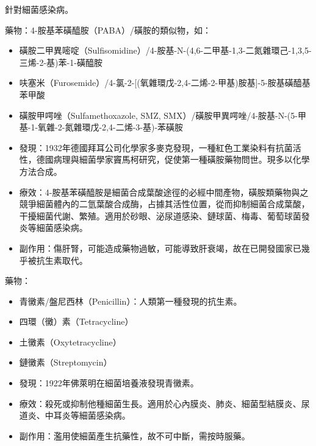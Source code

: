 \documentclass[a4paper,12pt]{report}
\begin{document}
針對細菌感染病。
\bit
\item 藥物：4-胺基苯磺醯胺（PABA）/磺胺的類似物，如：
\begin{itemize}
\item 磺胺二甲異嘧啶（Sulfisomidine）/4-胺基-N-(4,6-二甲基-1,3-二氮雜環己-1,3,5-三烯-2-基)苯-1-磺醯胺
\item 呋塞米（Furosemide）/4-氯-2-[(氧雜環戊-2,4-二烯-2-甲基)胺基]-5-胺基磺醯基苯甲酸
\item 磺胺甲㗁唑（Sulfamethoxazole, SMZ, SMX）/磺胺甲異㗁唑/4-胺基-N-(5-甲基-1-氧雜-2-氮雜環戊-2,4-二烯-3-基)-苯磺胺
\item 發現：1932年德國拜耳公司化學家多麥克發現，一種紅色工業染料有抗菌活性，德國病理與細菌學家竇馬柯研究，促使第一種磺胺藥物問世。現多以化學方法合成。
\item 療效：4-胺基苯磺醯胺是細菌合成葉酸途徑的必經中間產物，磺胺類藥物與之競爭細菌體內的二氫葉酸合成酶，占據其活性位置，從而抑制細菌合成葉酸，干擾細菌代謝、繁殖。適用於砂眼、泌尿道感染、鏈球菌、梅毒、葡萄球菌發炎等細菌感染病。
\item 副作用：傷肝腎，可能造成藥物過敏，可能導致肝衰竭，故在已開發國家已幾乎被抗生素取代。
\end{itemize}
\eit
{}
\bit
\item 藥物：
\begin{itemize}
\item 青黴素/盤尼西林（Penicillin）：人類第一種發現的抗生素。
\bct\bfH\ctr{}\ef\FB\ect
\item 四環（黴）素（Tetracycline）
\item 土黴素（Oxytetracycline）
\item 鏈黴素（Streptomycin）
\eit
\item 發現：1922年佛萊明在細菌培養液發現青黴素。
\item 療效：殺死或抑制他種細菌生長。適用於心內膜炎、肺炎、細菌型結膜炎、尿道炎、中耳炎等細菌感染病。
\item 副作用：濫用使細菌產生抗藥性，故不可中斷，需按時服藥。
\end{itemize}
\end{document}
